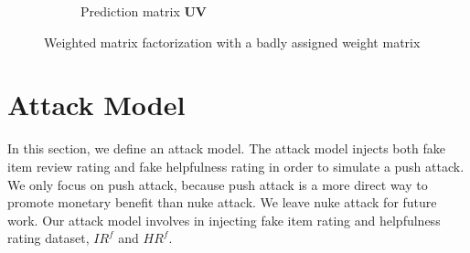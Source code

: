 \documentclass[master,english,final]{kaist-ucs}
\begin{document}
\begin{figure}[h]
\begin{subfigure}[b]{0.3\textwidth}
        \caption{Prediction matrix $\bm{UV}$}
        \label{wmf_bad_prediction}
    \end{subfigure}
    \caption{Weighted matrix factorization with a badly assigned weight matrix}
    \label{wmf_bad}
\end{figure}


\section{Attack Model}
In this section, we define an attack model.
The attack model injects both fake item review rating and fake helpfulness rating in order to simulate a push attack.
We only focus on push attack, because push attack is a more direct way to promote monetary benefit than nuke attack.
We leave nuke attack for future work.
Our attack model involves in injecting fake item rating and helpfulness rating dataset, $IR^f$ and $HR^f$.
\end{document}
